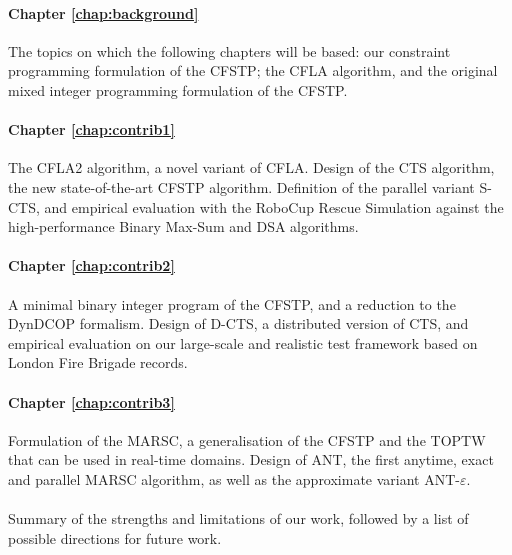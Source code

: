 \paragraph{Chapter \ref{chap:background}}
The topics on which the following chapters will be based: our constraint programming
formulation of the CFSTP; the CFLA algorithm, and the original mixed integer programming
formulation of the CFSTP.

\paragraph{Chapter \ref{chap:contrib1}}
The CFLA2 algorithm, a novel variant of CFLA. Design of the CTS algorithm, the new
state-of-the-art CFSTP algorithm. Definition of the parallel variant S-CTS, and empirical
evaluation with the RoboCup Rescue Simulation against the high-performance Binary Max-Sum
and DSA algorithms.

\paragraph{Chapter \ref{chap:contrib2}}
A minimal binary integer program of the CFSTP, and a reduction to the DynDCOP formalism.
Design of D-CTS, a distributed version of CTS, and empirical evaluation on our large-scale
and realistic test framework based on London Fire Brigade records.

\paragraph{Chapter \ref{chap:contrib3}}
Formulation of the MARSC, a generalisation of the CFSTP and the TOPTW that can be used in
real-time domains. Design of ANT, the first anytime, exact and parallel MARSC algorithm,
as well as the approximate variant ANT-$\varepsilon$.

\paragraph{}
Summary of the strengths and limitations of our work, followed by a list of possible
directions for future work.
